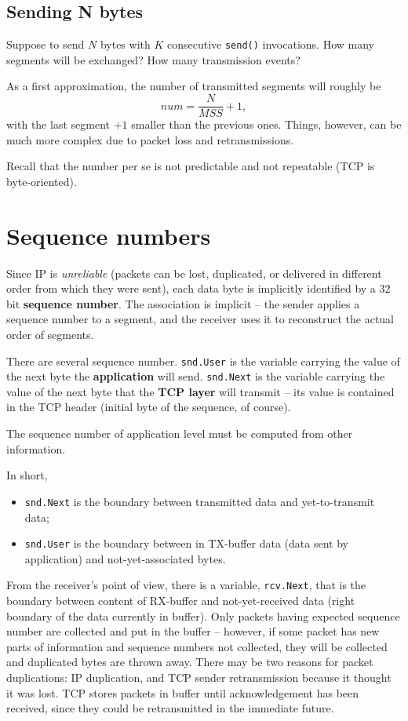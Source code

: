 \documentclass[a4paper, 11pt]{report}
\begin{document}
\subsection{Sending N bytes}

Suppose to send $N$ bytes with $K$ consecutive \texttt{send()} invocations. How
many segments will be exchanged? How many transmission events?

As a first approximation, the number of transmitted segments will roughly be
$$num = \frac{N}{MSS} + 1,$$ with the last segment $+1$ smaller than the
previous ones. Things, however, can be much more complex due to packet loss and
retransmissions.

Recall that the number per se is not predictable and not repeatable (TCP is
byte-oriented).

\section{Sequence numbers}

Since IP is \emph{unreliable} (packets can be lost, duplicated, or delivered in
different order from which they were sent), each data byte is implicitly
identified by a $32$ bit \textbf{sequence number}. The association is implicit
\--- the sender applies a sequence number to a segment, and the receiver uses
it to reconstruct the actual order of segments.

There are several sequence number. \texttt{snd.User} is the variable carrying
the value of the next byte the \textbf{application} will send.
\texttt{snd.Next} is the variable carrying the value of the next byte that the
\textbf{TCP layer} will transmit \--- its value is contained in the TCP header
(initial byte of the sequence, of course).

The sequence number of application level must be computed from other
information.

In short,

\begin{itemize}
	\item \texttt{snd.Next} is the boundary between transmitted data and
		yet-to-transmit data;
	\item \texttt{snd.User} is the boundary between in TX-buffer data (data
		sent by application) and not-yet-associated bytes.
\end{itemize}

From the receiver's point of view, there is a variable, \texttt{rcv.Next}, that
is the boundary between content of RX-buffer and not-yet-received data (right
boundary of the data currently in buffer). Only packets having expected
sequence number are collected and put in the buffer \--- however, if some
packet has new parts of information and sequence numbers not collected, they
will be collected and duplicated bytes are thrown away. There may be two
reasons for packet duplications: IP duplication, and TCP sender retransmission
because it thought it was lost. TCP stores packets in buffer until
acknowledgement has been received, since they could be retransmitted in the
immediate future.
\end{document}
